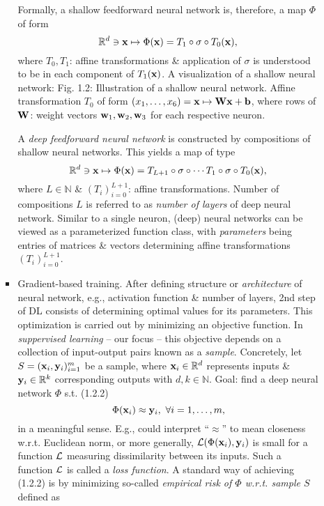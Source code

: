 \documentclass{article}
\begin{document}
\begin{itemize}
\begin{itemize}
\begin{itemize}
			Formally, a shallow feedforward neural network is, therefore, a map $\Phi$ of form
			\begin{equation}
				\label{shallow feedforward neural network}
				\mathbb{R}^d\ni{\bf x}\mapsto\Phi({\bf x}) = T_1\circ\sigma\circ T_0({\bf x}),
			\end{equation}
			where $T_0,T_1$: affine transformations \& application of $\sigma$ is understood to be in each component of $T_1({\bf x})$. A visualization of a shallow neural network: {\sf Fig. 1.2: Illustration of a shallow neural network. Affine transformation $T_0$ of form $(x_1,\ldots,x_6) = {\bf x}\mapsto{\bf W}{\bf x} + {\bf b}$, where rows of ${\bf W}$: weight vectors ${\bf w}_1,{\bf w}_2,{\bf w}_3$ for each respective neuron.}

			A {\it deep feedforward neural network} is constructed by compositions of shallow neural networks. This yields a map of type
			\begin{equation}
				\label{deep feedforward neural network}
				\mathbb{R}^d\ni{\bf x}\mapsto\Phi({\bf x}) = T_{L+1}\circ\sigma\circ\cdots T_1\circ\sigma\circ T_0({\bf x}),
			\end{equation}
			where $L\in\mathbb{N}$ \& $(T_i)_{i=0}^{L+1}$: affine transformations. Number of compositions $L$ is referred to as {\it number of layers} of deep neural network. Similar to a single neuron, (deep) neural networks can be viewed as a parameterized function class, with {\it parameters} being entries of matrices \& vectors determining affine transformations $(T_i)_{i=0}^{L+1}$.
			\item {\sf Gradient-based training.} After defining structure or {\it architecture} of neural network, e.g., activation function \& number of layers, 2nd step of DL consists of determining optimal values for its parameters. This optimization is carried out by minimizing an objective function. In {\it suppervised learning} -- our focus -- this objective depends on a collection of input-output pairs known as a {\it sample}. Concretely, let $S = ({\bf x}_i,{\bf y}_i)_{i=1}^m$ be a sample, where ${\bf x}_i\in\mathbb{R}^d$ represents inputs \& ${\bf y}_i\in\mathbb{R}^k$ corresponding outputs with $d,k\in\mathbb{N}$. Goal: find a deep neural network $\Phi$ s.t. (1.2.2)
			\begin{equation}
				\Phi({\bf x}_i)\approx{\bf y}_i,\ \forall i = 1,\ldots,m,
			\end{equation}
			in a meaningful sense. E.g., could interpret ``$\approx$'' to mean closeness w.r.t. Euclidean norm, or more generally, ${\cal L}(\Phi({\bf x}_i),{\bf y}_i)$ is small for a function ${\cal L}$ measuring dissimilarity between its inputs. Such a function ${\cal L}$ is called a {\it loss function}. A standard way of achieving (1.2.2) is by minimizing so-called {\it empirical risk of $\Phi$ w.r.t. sample $S$} defined as

\end{itemize}
\end{itemize}
\end{itemize}
\end{document}
